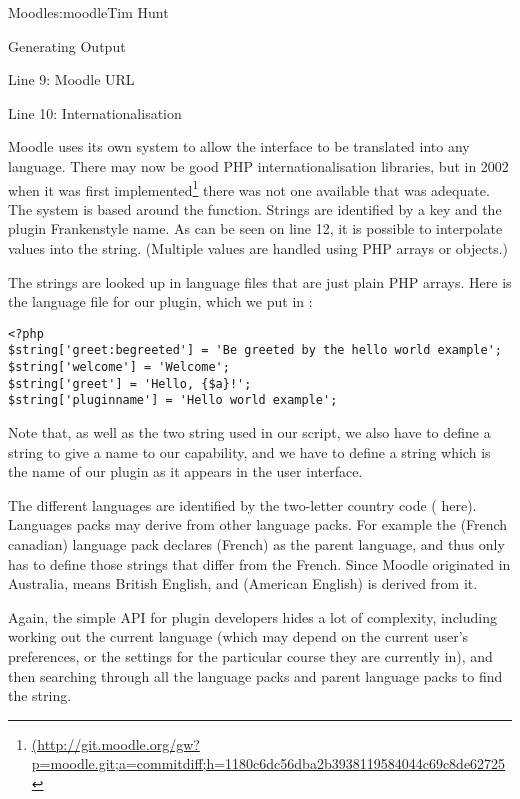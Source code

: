\begin{aosachapter}{Moodle}{s:moodle}{Tim Hunt}
\begin{aosasect1}{Generating Output}
\begin{aosasect2}{Line 9: Moodle URL}
\end{aosasect2}

\begin{aosasect2}{Line 10: Internationalisation}

Moodle uses its own system to allow the interface to be translated
into any language. There may now be good PHP internationalisation
libraries, but in 2002 when it was first
implemented\footnote{\url{(http://git.moodle.org/gw?p=moodle.git;a=commitdiff;h=1180c6dc56dba2b3938119584044c69c8de62725}}
there was not one available that was adequate. The system is based
around the  function. Strings are identified by a
key and the plugin Frankenstyle name. As can be seen on line 12, it is
possible to interpolate values into the string. (Multiple values are
handled using PHP arrays or objects.)

The strings are looked up in language files that are just plain PHP
arrays. Here is the language file for our plugin, which we put in
:

\begin{verbatim}
<?php
$string['greet:begreeted'] = 'Be greeted by the hello world example';
$string['welcome'] = 'Welcome';
$string['greet'] = 'Hello, {$a}!';
$string['pluginname'] = 'Hello world example';
\end{verbatim}

Note that, as well as the two string used in our script, we also have
to define a string to give a name to our capability, and we have to
define a string  which is the name of our plugin as
it appears in the user interface.

The different languages are identified by the two-letter country code
( here). Languages packs may derive from other language
packs. For example the  (French canadian) language pack
declares  (French) as the parent language, and thus only has
to define those strings that differ from the French. Since Moodle
originated in Australia,  means British English, and
 (American English) is derived from it.

Again, the simple  API for plugin developers hides a
lot of complexity, including working out the current language (which
may depend on the current user's preferences, or the settings for the
particular course they are currently in), and then searching through
all the language packs and parent language packs to find the string.


\end{aosasect2}
\end{aosasect1}
\end{aosachapter}
